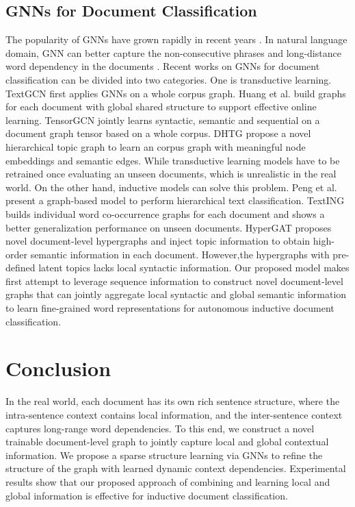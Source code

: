 \documentclass[letterpaper]{article} %
\begin{document}
\subsection{GNNs for Document Classification}
The popularity of GNNs have grown rapidly in recent years \cite{kipf2017semi, velivckovic2018graph, hamilton2017inductive,xu2018powerful}.
In natural language domain, GNN can better capture the non-consecutive phrases and long-distance word dependency in the documents \cite{wu2020comprehensive, li2020survey}. Recent works on GNNs for document classification can be divided into two categories.
One is transductive learning. TextGCN \cite{yao2019graph} first applies GNNs on a whole corpus graph. Huang et al. \cite{huang2019text} build graphs for each document with global shared structure to support effective online learning. TensorGCN \cite{liu2020tensor} jointly learns syntactic, semantic and sequential on a document graph tensor based on a whole corpus. DHTG \cite{wang2020learning} propose a novel hierarchical topic graph to learn an corpus graph with meaningful node embeddings and semantic edges.
While transductive learning models have to be retrained once evaluating an unseen documents, which is unrealistic in the real world.
On the other hand, inductive models can solve this problem. Peng et al. \cite{peng2018large} present a graph-based model to perform hierarchical text classification. TextING \cite{zhang2020every} builds individual word co-occurrence graphs for each document and shows a better generalization performance on unseen documents.
HyperGAT \cite{ding2020more} proposes novel document-level hypergraphs and inject topic information to obtain high-order semantic information in each document.
However,the hypergraphs with pre-defined latent topics lacks local syntactic information.
Our proposed model makes first attempt to leverage sequence information to construct novel document-level graphs that can jointly aggregate local syntactic and global semantic information to learn fine-grained word representations for autonomous inductive document classification.

\section{Conclusion}

In the real world, each document has its own rich sentence structure, where the intra-sentence context contains local information, and the inter-sentence context captures long-range word dependencies. To this end, we construct a novel trainable document-level graph to jointly capture local and global contextual information. We propose a sparse structure learning via GNNs to refine the structure of the graph with learned dynamic context dependencies. Experimental results show that our proposed approach of combining and learning local and global information is effective for inductive document classification.
\end{document}
